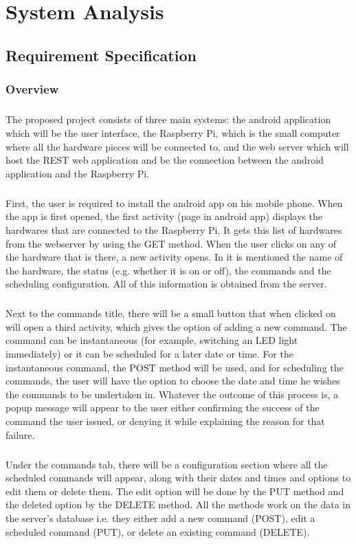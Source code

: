 \documentclass[12pt, oneside, a4paper]{book}
\newcommand{\mychapter}[1]{\newpage%
	\thispagestyle{empty}
	\topskip0pt%
	\vspace*{\fill}%
	\addtocounter{chapter}{1}%
	\begin{center}%
		\textbf{\Large{\color{chapter}{CHAPTER NO. \thechapter \\ \uppercase{#1}}}}%
	\end{center}%
	\vspace*{\fill}%
	\addtocounter{chapter}{-1}
	\newpage%
	\chapter{#1}
}
\begin{document}
	\mychapter{System Analysis}
		\section{Requirement Specification}
			\subsection{Overview}
				\paragraph{} The proposed project consists of three main systems: the android application which will be the user interface, the Raspberry Pi, which is the small computer where all the hardware pieces will be connected to, and the web server which will host the REST web application and be the connection between the android application and the Raspberry Pi.
				\paragraph{}First, the user is required to install the android app on his mobile phone. When the app is first opened, the first activity (page in android app) displays the hardwares that are connected to the Raspberry Pi. It gets this list of hardwares from the webserver by using the GET method. When the user clicks on any of the hardware that is there, a new activity opens. In it is mentioned the name of the hardware, the status (e.g. whether it is on or off), the commands and the scheduling configuration. All of this information is obtained from the server. 
				\paragraph{}Next to the commands title, there will be a small button that when clicked on will open a third activity, which gives the option of adding a new command. The command can be instantaneous (for example, switching an LED light immediately) or it can be scheduled for a later date or time. For the instantaneous command, the POST method will be used, and for scheduling the commands, the user will have the option to choose the date and time he wishes the commands to be undertaken in. Whatever the outcome of this process is, a popup message will appear to the user either confirming the success of the command the user issued, or denying it while explaining the reason for that failure.
				\paragraph{}Under the commands tab, there will be a  configuration 	section where all the scheduled commands will appear, along with their dates and times and options to edit them or delete them. The edit option will be done by the PUT method and the deleted option by the DELETE method. All the methods work on the data in the server’s database i.e. they either add a new command (POST), edit a scheduled command (PUT), or delete an existing command (DELETE). 
\end{document}

